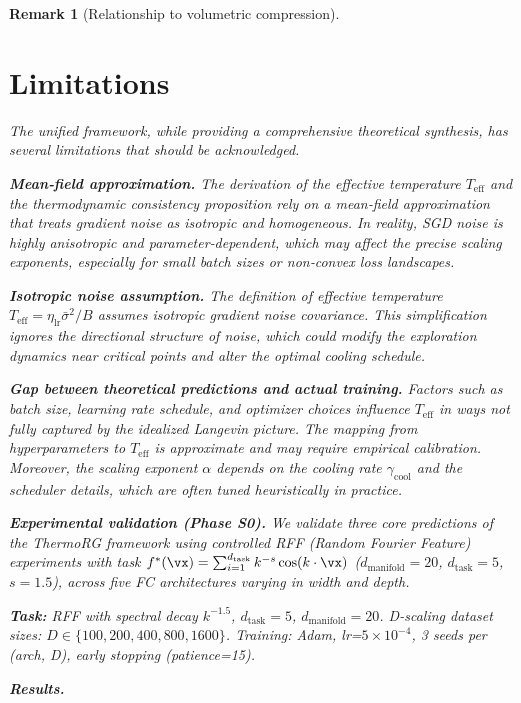 \documentclass[11pt, a4paper]{article}
\theoremstyle{plain}
\newtheorem*{remark}{Remark}
\begin{document}
\begin{remark}[Relationship to volumetric compression]
\section{Limitations}
\label{sec:limitations}

The unified framework, while providing a comprehensive theoretical synthesis, has several limitations that should be acknowledged.

\textbf{Mean‑field approximation.} The derivation of the effective temperature $T_{\text{eff}}$ and the thermodynamic consistency proposition rely on a mean‑field approximation that treats gradient noise as isotropic and homogeneous. In reality, SGD noise is highly anisotropic and parameter‑dependent, which may affect the precise scaling exponents, especially for small batch sizes or non‑convex loss landscapes.

\textbf{Isotropic noise assumption.} The definition of effective temperature $T_{\text{eff}} = \eta_{\text{lr}}\bar{\sigma}^2/B$ assumes isotropic gradient noise covariance. This simplification ignores the directional structure of noise, which could modify the exploration dynamics near critical points and alter the optimal cooling schedule.

\textbf{Gap between theoretical predictions and actual training.} Factors such as batch size, learning rate schedule, and optimizer choices influence $T_{\text{eff}}$ in ways not fully captured by the idealized Langevin picture. The mapping from hyperparameters to $T_{\text{eff}}$ is approximate and may require empirical calibration. Moreover, the scaling exponent $\alpha$ depends on the cooling rate $\gamma_{\text{cool}}$ and the scheduler details, which are often tuned heuristically in practice.

\textbf{Experimental validation (Phase S0).} We validate three core predictions of the ThermoRG framework using controlled RFF (Random Fourier Feature) experiments with task $f^*(\vx) = \sum_{i=1}^{d_{\mathrm{task}}} k^{-s}\cos(k\cdot\vx)$ ($d_{\mathrm{manifold}}=20$, $d_{\mathrm{task}}=5$, $s=1.5$), across five FC architectures varying in width and depth.

\bigskip
\noindent\textbf{Task:} RFF with spectral decay $k^{-1.5}$, $d_{\mathrm{task}}=5$, $d_{\mathrm{manifold}}=20$.
D-scaling dataset sizes: $D \in \{100, 200, 400, 800, 1600\}$.
Training: Adam, lr=$5\times10^{-4}$, 3 seeds per (arch, D), early stopping (patience=15).

\bigskip
\noindent\textbf{Results.}


\end{remark}
\end{document}
